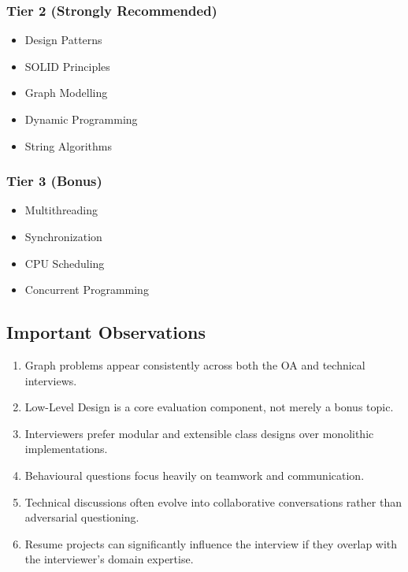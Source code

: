 \documentclass[11pt,a4paper]{article}
\begin{document}
\subsubsection{Tier 2 (Strongly Recommended)}

\begin{itemize}
	\item Design Patterns
	\item SOLID Principles
	\item Graph Modelling
	\item Dynamic Programming
	\item String Algorithms
\end{itemize}

\subsubsection{Tier 3 (Bonus)}

\begin{itemize}
	\item Multithreading
	\item Synchronization
	\item CPU Scheduling
	\item Concurrent Programming
\end{itemize}


\subsection{Important Observations}

\begin{enumerate}
	\item Graph problems appear consistently across both the OA and technical interviews.
	\item Low-Level Design is a core evaluation component, not merely a bonus topic.
	\item Interviewers prefer modular and extensible class designs over monolithic implementations.
	\item Behavioural questions focus heavily on teamwork and communication.
	\item Technical discussions often evolve into collaborative conversations rather than adversarial questioning.
	\item Resume projects can significantly influence the interview if they overlap with the interviewer's domain expertise.
\end{enumerate}
\end{document}

